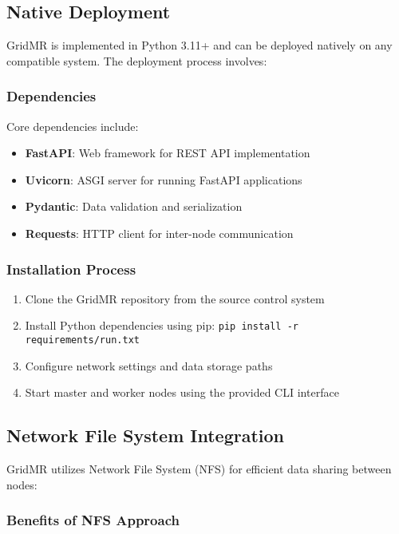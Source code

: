 \documentclass[11pt,letterpaper,oneside]{article}
\begin{document}
\subsection{Native Deployment}

GridMR is implemented in Python 3.11+ and can be deployed natively on any compatible system. The deployment process involves:

\subsubsection{Dependencies}

Core dependencies include:
\begin{itemize}
    \item \textbf{FastAPI}: Web framework for REST API implementation
    \item \textbf{Uvicorn}: ASGI server for running FastAPI applications
    \item \textbf{Pydantic}: Data validation and serialization
    \item \textbf{Requests}: HTTP client for inter-node communication
\end{itemize}

\subsubsection{Installation Process}

\begin{enumerate}
    \item Clone the GridMR repository from the source control system
    \item Install Python dependencies using pip: \texttt{pip install -r requirements/run.txt}
    \item Configure network settings and data storage paths
    \item Start master and worker nodes using the provided CLI interface
\end{enumerate}

\subsection{Network File System Integration}

GridMR utilizes Network File System (NFS) for efficient data sharing between nodes:

\subsubsection{Benefits of NFS Approach}
\end{document}
